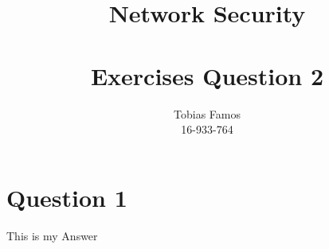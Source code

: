 \documentclass[11pt,a4paper]{article}
\title{Network Security \\ ~\\ \Large{Exercises Question 2}}
\author{Tobias Famos\\ 16-933-764}
\begin{document}
    \maketitle
    \section{Question 1}
    This is my Answer
\end{document}
